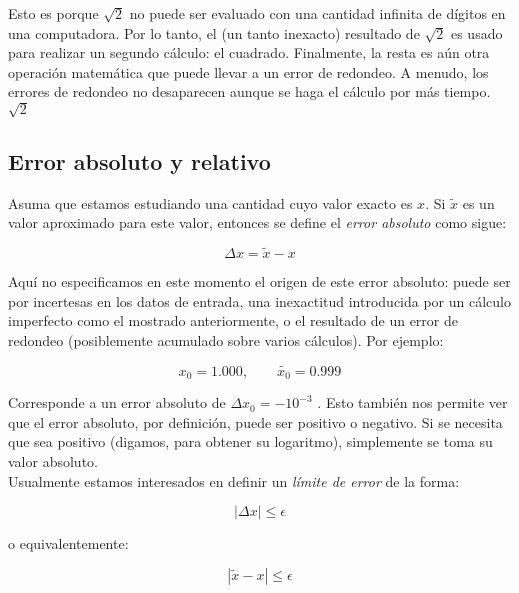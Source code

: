 \documentclass[11pt]{article}
\begin{document}
    Esto es porque \(\sqrt{2}\) no puede ser evaluado con una cantidad
infinita de dígitos en una computadora. Por lo tanto, el (un tanto
inexacto) resultado de \(\sqrt{2}\) es usado para realizar un segundo
cálculo: el cuadrado. Finalmente, la resta es aún otra operación
matemática que puede llevar a un error de redondeo. A menudo, los
errores de redondeo no desaparecen aunque se haga el cálculo por más
tiempo.\(\sqrt{2}\)

\hypertarget{error-absoluto-y-relativo}{%
\subsection{Error absoluto y relativo}\label{error-absoluto-y-relativo}}

Asuma que estamos estudiando una cantidad cuyo valor exacto es \(x\). Si
\(\tilde{x}\) es un valor aproximado para este valor, entonces se define
el \emph{error absoluto} como sigue:

\[
\begin{equation} 
\Delta x = \tilde{x} - x  \label{2.5}\tag{2}
\end{equation}
\]

Aquí no especificamos en este momento el origen de este error absoluto:
puede ser por incertesas en los datos de entrada, una inexactitud
introducida por un cálculo imperfecto como el mostrado anteriormente, o
el resultado de un error de redondeo (posiblemente acumulado sobre
varios cálculos). Por ejemplo:

\[
\begin{equation}
x_0 = 1.000, \quad \quad \tilde{x_0} = 0.999 \label{2.6}\tag{3}
\end{equation}
\]

Corresponde a un error absoluto de \(\Delta x_0 = -10^{-3}\) . Esto
también nos permite ver que el error absoluto, por definición, puede ser
positivo o negativo. Si se necesita que sea positivo (digamos, para
obtener su logaritmo), simplemente se toma su valor absoluto.\\
Usualmente estamos interesados en definir un \emph{límite de error} de
la forma:

\[
\begin{equation}
|\Delta x| \leq \epsilon \label{2.7}\tag{4}
\end{equation}
\]

o equivalentemente:

\[
\begin{equation}
|\tilde{x} - x| \leq \epsilon \label{2.8}\tag{5}
\end{equation}
\]
\end{document}
